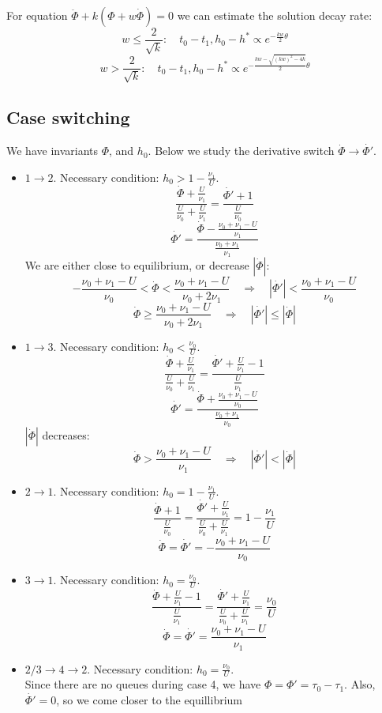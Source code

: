 \documentclass[12pt]{article}
\begin{document}
For equation $\ddot{\Phi} + k (\Phi + w \dot{\Phi}) = 0$ we can estimate the solution decay rate:
$$ w \leq \frac{2}{\sqrt{k}}: \quad t_0 - t_1, h_0 - h^* \propto e^{-\frac{kw}{2} \theta}$$ 
$$w > \frac{2}{\sqrt{k}}: \quad t_0 - t_1, h_0 - h^* \propto e^{-\frac{kw - \sqrt{(kw)^2 - 4k}}{2}\theta}$$

\subsection*{Case switching}

We have invariants $\Phi$, and $h_0$. Below we study the derivative switch $ \dot{\Phi} \to \dot{\Phi'} $. 

\begin{itemize}

	\item $1 \to 2$. Necessary condition: $h_0 > 1 - \frac{\nu_1}{U}$.
$$ \frac{\dot{\Phi} + \frac{U}{\nu_1}}{\frac{U}{\nu_0} + \frac{U}{\nu_1}} = \frac{\dot{\Phi'} + 1}{\frac{U}{\nu_0}}$$		
$$ \dot{\Phi'} = \frac{\dot{\Phi} - \frac{ \nu_0 + \nu_1 - U }{\nu_1} }{\frac{\nu_0 + \nu_1}{\nu_1}} $$
We are either close to equilibrium, or decrease $|\dot{\Phi}|$:
$$ - \frac{\nu_0 + \nu_1 - U}{\nu_0} < \dot{\Phi} < \frac{\nu_0 + \nu_1 - U}{\nu_0 + 2\nu_1} \quad \Rightarrow \quad  | \dot{\Phi'}| < \frac{\nu_0 + \nu_1 - U}{\nu_0} $$
$$ \dot{\Phi} \geq \frac{\nu_0 + \nu_1 - U}{\nu_0 + 2\nu_1}  \quad \Rightarrow \quad |\dot{\Phi'}| \leq |\dot{\Phi}| $$

	\item $1 \to 3$. Necessary condition: $h_0 < \frac{\nu_0}{U}$.
$$  \frac{\dot{\Phi} + \frac{U}{\nu_1}}{\frac{U}{\nu_0} + \frac{U}{\nu_1}} = \frac{\dot{\Phi'} + \frac{U}{\nu_1} - 1}{\frac{U}{\nu_1}} $$
$$ \dot{\Phi'} = \frac{ \dot{\Phi} + \frac{\nu_0 + \nu_1 - U}{\nu_0} }{ \frac{\nu_0 + \nu_1}{\nu_0} } $$
 $|\dot{\Phi}|$ decreases:
$$ \dot{\Phi} > \frac{\nu_0 + \nu_1 - U}{\nu_1} \quad \Rightarrow \quad |\dot{\Phi'}| < | \dot{\Phi} | $$

	\item $2 \to 1$. Necessary condition: $h_0 = 1 - \frac{\nu_1}{U}$.
$$     \frac{\dot{\Phi} + 1}{\frac{U}{\nu_0}} = \frac{\dot{\Phi'} + \frac{U}{\nu_1}}{\frac{U}{\nu_0} + \frac{U}{\nu_1}} = 1 - \frac{\nu_1}{U} $$
 $$ \dot{\Phi}= \dot{\Phi'} = - \frac{\nu_0 + \nu_1 - U}{\nu_0}$$

	\item $3 \to 1$. Necessary condition: $h_0 = \frac{\nu_0}{U}$.
$$ \frac{ \dot{\Phi} + \frac{U}{\nu_1} - 1}{\frac{U}{\nu_1}} = \frac{\dot{\Phi'} + \frac{U}{\nu_1}}{\frac{U}{\nu_0} + \frac{U}{\nu_1}} = \frac{\nu_0}{U} $$
$$ \dot{\Phi}= \dot{\Phi'} = \frac{\nu_0 + \nu_1 - U}{\nu_1}$$


	\item $ 2/3 \to 4 \to 2$. Necessary condition: $h_0 = \frac{\nu_0}{U}$.
	\\
	Since there are no queues during case 4, we have $\Phi = \Phi' = \tau_0 -\tau_1$. Also, $\dot{\Phi'} = 0$, so we come closer to the equillibrium

	

\end{itemize}
\end{document}
